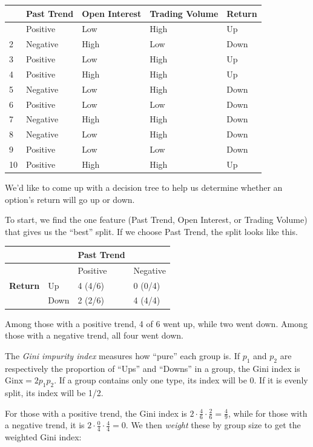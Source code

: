 \documentclass[
]{book}
\theoremstyle{definition}
\theoremstyle{definition}
\theoremstyle{definition}
\theoremstyle{definition}
\theoremstyle{remark}
\begin{document}
\begin{longtable}[]{@{}lllll@{}}
\toprule\noalign{}
& Past Trend & Open Interest & Trading Volume & Return \\
\midrule\noalign{}
\endhead
\bottomrule\noalign{}
\endlastfoot
1 & Positive & Low & High & Up \\
2 & Negative & High & Low & Down \\
3 & Positive & Low & High & Up \\
4 & Positive & High & High & Up \\
5 & Negative & Low & High & Down \\
6 & Positive & Low & Low & Down \\
7 & Negative & High & High & Down \\
8 & Negative & Low & High & Down \\
9 & Positive & Low & Low & Down \\
10 & Positive & High & High & Up \\
\end{longtable}

We'd like to come up with a decision tree to help us determine whether an option's return will go up or down.

To start, we find the one feature (Past Trend, Open Interest, or Trading Volume) that gives us the ``best'' split. If we choose Past Trend, the split looks like this.

\begin{longtable}[]{@{}llll@{}}
\toprule\noalign{}
& & \textbf{Past Trend} & \\
\midrule\noalign{}
\endhead
\bottomrule\noalign{}
\endlastfoot
& & Positive & Negative \\
\textbf{Return} & Up & 4 (4/6) & 0 (0/4) \\
& Down & 2 (2/6) & 4 (4/4) \\
\end{longtable}

Among those with a positive trend, 4 of 6 went up, while two went down. Among those with a negative trend, all four went down.

The \emph{Gini impurity index} measures how ``pure'' each group is. If \(p_1\) and \(p_2\) are respectively the proportion of ``Ups'' and ``Downs'' in a group, the Gini index is \(\text{Ginx}=2p_1p_2\). If a group contains only one type, its index will be 0. If it is evenly split, its index will be 1/2.

For those with a positive trend, the Gini index is \(2\cdot\frac{4}{6}\cdot\frac{2}{6}=\frac{4}{9}\), while for those with a negative trend, it is \(2\cdot\frac{0}{4}\cdot\frac{4}{4}=0\). We then \emph{weight} these by group size to get the weighted Gini index:
\end{document}
